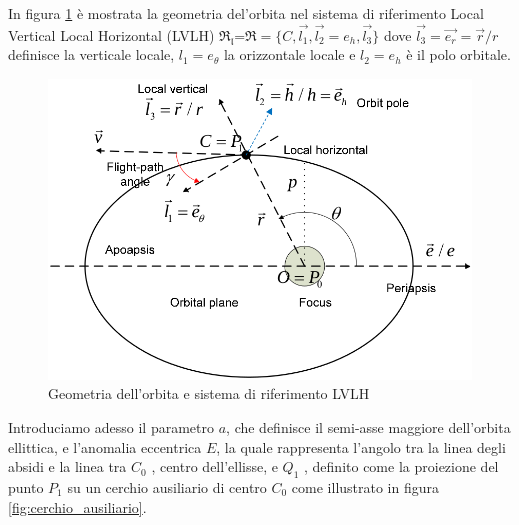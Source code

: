In figura \ref{fig:LVLH} è mostrata la
geometria del'orbita nel sistema di riferimento Local Vertical Local Horizontal (LVLH)
$\mathfrak{R_l}$=$\mathfrak{R}=\{C,\vec{l_1},\vec{l_2}=e_h,\vec{l_3}\}$ dove
$\vec{l_3}=\vec{e_r}=\vec{r}/r$ definisce la verticale locale, $l_1=e_{\theta}$
la orizzontale locale e $l_2=e_h$ è il polo orbitale.


\begin{figure}[htp]
\begin{center}
  \includegraphics[width=\textwidth]{modelling/orbit_dynamics/image/LVLH.png}
  \caption{Geometria dell'orbita e sistema di riferimento LVLH}
  \label{fig:LVLH}
\end{center}
\end{figure}


Introduciamo adesso il parametro $a$, che definisce il semi-asse maggiore
dell'orbita ellittica, e l'anomalia eccentrica $E$, la quale rappresenta
l'angolo tra la linea degli absidi e la linea tra $C_0$ , centro dell’ellisse, e $Q_1$ ,
definito come la proiezione del punto $P_1$ su un cerchio ausiliario di centro
$C_0$ come illustrato in figura \ref{fig:cerchio_ausiliario}.


